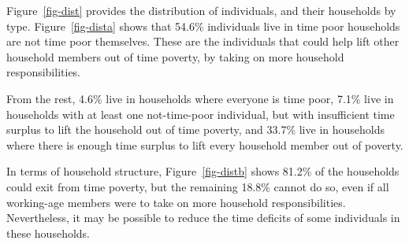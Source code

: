 \documentclass[
  11pt,
]{article}
\begin{document}
Figure~\ref{fig-dist} provides the distribution of individuals, and
their households by type. Figure~\ref{fig-dista} shows that 54.6\%
individuals live in time poor households are not time poor themselves.
These are the individuals that could help lift other household members
out of time poverty, by taking on more household responsibilities.

From the rest, 4.6\% live in households where everyone is time poor,
7.1\% live in households with at least one not-time-poor individual, but
with insufficient time surplus to lift the household out of time
poverty, and 33.7\% live in households where there is enough time
surplus to lift every household member out of poverty.

In terms of household structure, Figure~\ref{fig-distb} shows 81.2\% of
the households could exit from time poverty, but the remaining 18.8\%
cannot do so, even if all working-age members were to take on more
household responsibilities. Nevertheless, it may be possible to reduce
the time deficits of some individuals in these households.
\end{document}
